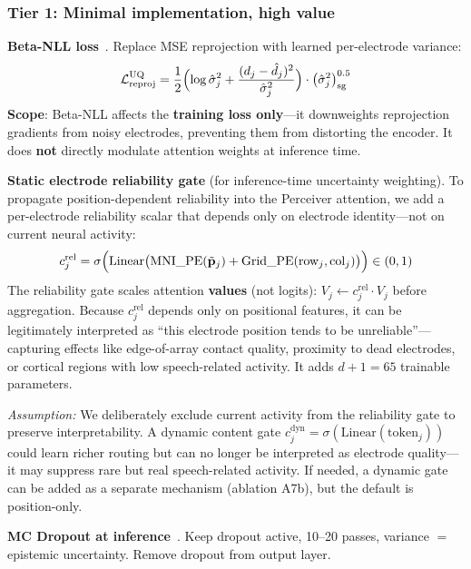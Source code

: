 \documentclass[11pt,letterpaper]{article}
\newcommand{\assumption}[1]{\par\smallskip\noindent\textcolor{BrickRed}{\textit{Assumption:} #1}\smallskip}
\newcommand{\bfp}{\mathbf{p}}
\begin{document}
\subsubsection{Tier 1: Minimal implementation, high value}

\textbf{Beta-NLL loss}~\cite{seitzer2022}. Replace MSE reprojection with learned per-electrode variance:
\begin{equation}
\mathcal{L}_{\text{reproj}}^{\text{UQ}} = \frac{1}{2}\Bigl(\log \hat{\sigma}_j^2 + \frac{(d_j - \hat{d}_j)^2}{\hat{\sigma}_j^2}\Bigr) \cdot \bigl(\hat{\sigma}_j^2\bigr)^{0.5}_{\text{sg}}
\end{equation}
\textbf{Scope}: Beta-NLL affects the \textbf{training loss only}---it downweights reprojection gradients from noisy electrodes, preventing them from distorting the encoder. It does \textbf{not} directly modulate attention weights at inference time.

\textbf{Static electrode reliability gate} (for inference-time uncertainty weighting). To propagate position-dependent reliability into the Perceiver attention, we add a per-electrode reliability scalar that depends only on electrode identity---not on current neural activity:
\begin{equation}
c_j^{\text{rel}} = \sigma\Bigl(\text{Linear}\bigl(\text{MNI\_PE}(\tilde{\bfp}_j) + \text{Grid\_PE}(\text{row}_j, \text{col}_j)\bigr)\Bigr) \in (0, 1)
\end{equation}
The reliability gate scales attention \textbf{values} (not logits): $V_j \leftarrow c_j^{\text{rel}} \cdot V_j$ before aggregation.
Because $c_j^{\text{rel}}$ depends only on positional features, it can be legitimately interpreted as ``this electrode position tends to be unreliable''---capturing effects like edge-of-array contact quality, proximity to dead electrodes, or cortical regions with low speech-related activity. It adds $d{+}1 = 65$ trainable parameters.

\assumption{We deliberately exclude current activity from the reliability gate to preserve interpretability. A dynamic content gate $c_j^{\text{dyn}} = \sigma(\text{Linear}(\text{token}_j))$ could learn richer routing but can no longer be interpreted as electrode quality---it may suppress rare but real speech-related activity. If needed, a dynamic gate can be added as a separate mechanism (ablation A7b), but the default is position-only.}

\textbf{MC Dropout at inference}~\cite{gal2016}. Keep dropout active, 10--20 passes, variance $=$ epistemic uncertainty. Remove dropout from output layer.
\end{document}
